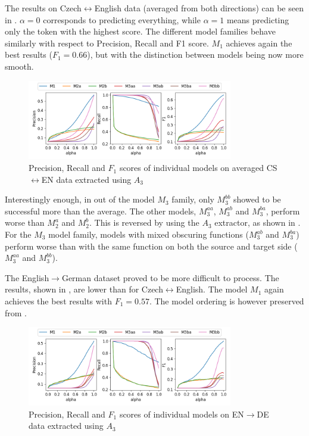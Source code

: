 The results on Czech$\leftrightarrow$English data (averaged from both directions) can be seen in . $\alpha = 0$ corresponds to predicting everything, while $\alpha = 1$ means predicting only the token with the highest score. The different model families behave similarly with respect to Precision, Recall and F1 score. $M_1$ achieves again the best results ($F_1 = 0.66$), but with the distinction between models being now more smooth.

\begin{figure}[h!]
    \center
    \includegraphics[width=0.8\textwidth]{img/individual_encs_mix_a3.png}
    \caption{Precision, Recall and $F_1$ scores of individual models on averaged CS$\leftrightarrow$EN data extracted using $A_3$ \label{fig:individual_encs_mix_a3}}
\end{figure}

Interestingly enough, in  out of the model $M_3$ family, only $M_3^{bb}$ showed to be successful more than the average. The other models, $M_3^{aa}$, $M_3^{ab}$ and $M_3^{ba}$, perform worse than $M_2^a$ and $M_2^b$. This is reversed by using the $A_3$ extractor, as shown in . For the $M_3$ model family, models with mixed obscuring functions ($M_3^{ab}$ and $M_3^{ba}$) perform worse than with the same function on both the source and target side ($M_3^{aa}$ and $M_3^{bb}$).

The English$\rightarrow$German dataset proved to be more difficult to process. The results, shown in , are lower than for Czech$\leftrightarrow$English. The model $M_1$ again achieves the best results with $F_1 = 0.57$. The model ordering is however preserved from .

\begin{figure}[h!]
    \center
    \includegraphics[width=0.8\textwidth]{img/individual_ende_a3.png}
    \caption{Precision, Recall and $F_1$ scores of individual models on EN$\rightarrow$DE data extracted using $A_3$ \label{fig:individual_ende_a3}}
\end{figure}

